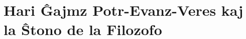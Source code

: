 \part{Hari Ĝajmz Potr-Evanz-Veres kaj la Ŝtono de la Filozofo}
% 
% 
% 
% 
% 
% 
% 
% 
% 
% 
% 
% 
% 
% 
% 
% 
% 
% 
% 

% 
% 
% 


